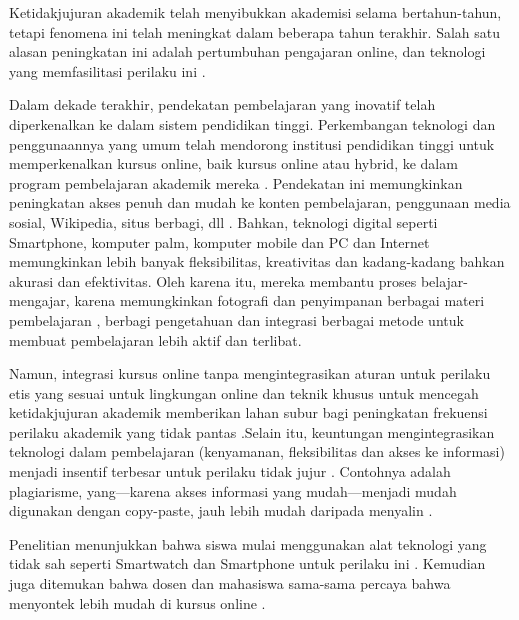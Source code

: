 Ketidakjujuran akademik telah menyibukkan akademisi selama bertahun-tahun, tetapi fenomena ini telah meningkat dalam beberapa tahun terakhir. Salah satu alasan peningkatan ini adalah pertumbuhan pengajaran online, dan teknologi yang memfasilitasi perilaku ini \citep{etgar2019white} \citep{peytcheva2018impact} \citep{sarwar2018paid}.

Dalam dekade terakhir, pendekatan pembelajaran yang inovatif telah diperkenalkan ke dalam sistem pendidikan tinggi. Perkembangan teknologi dan penggunaannya yang umum telah mendorong institusi pendidikan tinggi untuk memperkenalkan kursus online, baik kursus online atau hybrid, ke dalam program pembelajaran akademik mereka \citep{lee2017online} \citep{marshall2017attack}. Pendekatan ini memungkinkan peningkatan akses penuh dan mudah ke konten pembelajaran, penggunaan media sosial, Wikipedia, situs berbagi, dll \citep{ahmed2018student} \citep{lee2017online} \citep{peytcheva2018impact}. Bahkan, teknologi digital seperti Smartphone, komputer palm, komputer mobile dan PC dan Internet memungkinkan lebih banyak fleksibilitas, kreativitas dan kadang-kadang bahkan akurasi dan efektivitas. Oleh karena itu, mereka membantu proses belajar-mengajar, karena memungkinkan fotografi dan penyimpanan berbagai materi pembelajaran \citep{peytcheva2018impact} \citep{stephens2007does}, berbagi pengetahuan dan integrasi berbagai metode untuk membuat pembelajaran lebih aktif dan terlibat. 

Namun, integrasi kursus online tanpa mengintegrasikan aturan untuk perilaku etis yang sesuai untuk lingkungan online dan teknik khusus untuk mencegah ketidakjujuran akademik memberikan lahan subur bagi peningkatan frekuensi perilaku akademik yang tidak pantas \citep{marshall2017attack}.Selain itu, keuntungan mengintegrasikan teknologi dalam pembelajaran (kenyamanan, fleksibilitas dan akses ke informasi) menjadi insentif terbesar untuk perilaku tidak jujur \citep{blau2017ethical} \citep{muhammad2020factors} \citep{peytcheva2018impact}. Contohnya adalah plagiarisme, yang—karena akses informasi yang mudah—menjadi mudah digunakan dengan copy-paste, jauh lebih mudah daripada menyalin \citep{sidi2019ethical}.

Penelitian menunjukkan bahwa siswa mulai menggunakan alat teknologi yang tidak sah seperti Smartwatch dan Smartphone untuk perilaku ini \citep{birks2020managing} \citep{blau2017ethical}. Kemudian juga ditemukan bahwa dosen dan mahasiswa sama-sama percaya bahwa menyontek lebih mudah di kursus online \citep{kennedy2000academic}.

